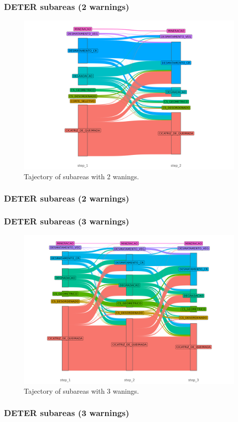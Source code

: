 \documentclass[aspectratio=169]{beamer}
\begin{document}
\begin{frame}
    \frametitle{DETER subareas (2 warnings)}
    \begin{figure}[h] 
        \includegraphics[width=0.65\linewidth]
        {./figures/plot_deter_subarea_trajectory_2.png}
        \caption{Tajectory of subareas with 2 wanings.}
        \label{fig:deter_subarea_trajectory_2}
    \end{figure}
\end{frame}
\begin{frame}[allowframebreaks]
    \frametitle{DETER subareas (2 warnings)}
    
\end{frame}

\begin{frame}
    \frametitle{DETER subareas (3 warnings)}
    \begin{figure}[h] 
        \includegraphics[width=0.65\linewidth]
        {./figures/plot_deter_subarea_trajectory_3.png}
        \caption{Tajectory of subareas with 3 wanings.}
        \label{fig:deter_subarea_trajectory_3}
    \end{figure}
\end{frame}
\begin{frame}[allowframebreaks]
    \frametitle{DETER subareas (3 warnings)}
    
\end{frame}
\end{document}
